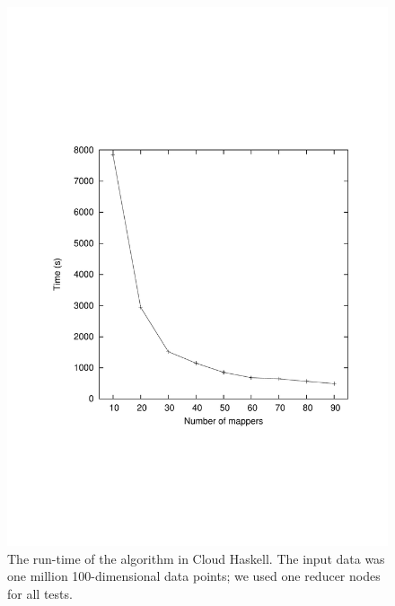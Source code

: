 \documentclass[preprint]{sigplanconf}
\begin{document}
\begin{figure}[t]
\centerline {
 \includegraphics[width=\columnwidth]{ec2_cropped}
}
\vspace{0.5ex}
\caption{ 
\label{fig:performance1}
The run-time of the \kmeans{} algorithm in Cloud Haskell. The input data was one million 100-dimensional data points; we used one reducer nodes for all tests. %
}
\end{figure}
\end{document}
